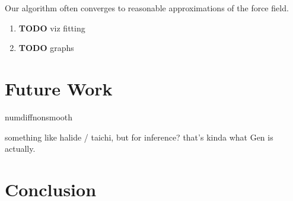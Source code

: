 \documentclass[11pt]{article}
\begin{document}
Our algorithm often converges to reasonable approximations of the force field.

\begin{enumerate}
\item {\bfseries\sffamily TODO} viz fitting
\label{sec:orge682875}
\item {\bfseries\sffamily TODO} graphs
\label{sec:orgacb6a70}
\end{enumerate}

\section{Future Work}
\label{sec:org4f76e6e}

numdiffnonsmooth

something like halide / taichi, but for inference?
that's kinda what Gen is actually.

\section{Conclusion}
\label{sec:orge93afeb}



\end{document}
